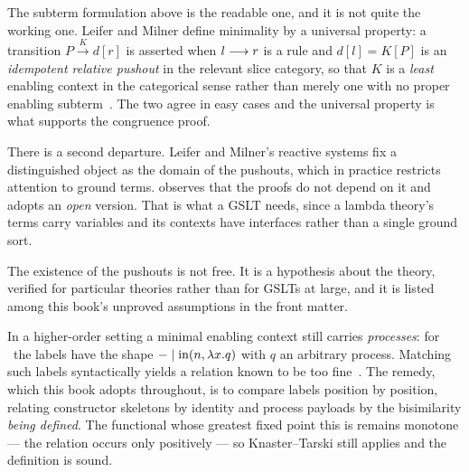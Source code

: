 \begin{remark}
\label{lts:rem:universal}
The subterm formulation above is the readable one, and it is not quite the
working one. Leifer and Milner define minimality by a universal property: a
transition $P \xrightarrow{K} d[r]$ is asserted when $l \longrightarrow r$ is a rule and
$d[l] = K[P]$ is an \emph{idempotent relative pushout} in the relevant slice
category, so that $K$ is a \emph{least} enabling context in the categorical sense
rather than merely one with no proper enabling subterm~\cite{leifer2000deriving}.
The two agree in easy cases and the universal property is what supports the
congruence proof.

There is a second departure. Leifer and Milner's reactive systems fix a
distinguished object as the domain of the pushouts, which in practice restricts
attention to ground terms. \cite{BIHOL} observes that the proofs do not depend on
it and adopts an \emph{open} version. That is what a GSLT needs, since a lambda
theory's terms carry variables and its contexts have interfaces rather than a
single ground sort.

The existence of the pushouts is not free. It is a hypothesis about the theory,
verified for particular theories rather than for GSLTs at large, and it is
listed among this book's unproved assumptions in the front matter.
\end{remark}

\begin{remark}
\label{lts:rem:higherorder}
In a higher-order setting a minimal enabling context still carries
\emph{processes}: for \rhoc\ the labels have the shape
$-\mid\mathrm{in}(n,\lambda x.q)$ with $q$ an arbitrary process. Matching such
labels syntactically yields a relation known to be too
fine~\cite{sangiorgi}. The remedy, which this book adopts throughout, is to
compare labels position by position, relating constructor skeletons by identity
and process payloads by the bisimilarity \emph{being defined}. The functional
whose greatest fixed point this is remains monotone --- the relation occurs only
positively --- so Knaster--Tarski still applies and the definition is sound.
\end{remark}

